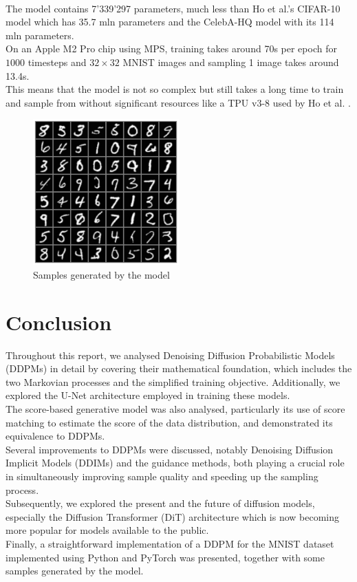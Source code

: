\documentclass[twoside]{article}
\numberwithin{equation}{section}
\numberwithin{figure}{section}
\begin{document}
\\
The model contains 7'339'297 parameters, much less than Ho et al.'s CIFAR-10 model which has 35.7 mln parameters and the CelebA-HQ model with its 114 mln parameters. \cite{ho2020denoising} \\
On an Apple M2 Pro chip using MPS, training takes around 70s per epoch for $1000$ timesteps and $32 \times 32$ MNIST images and sampling 1 image takes around 13.4s. \\
This means that the model is not so complex but still takes a long time to train and sample from without significant resources like a TPU v3-8 used by Ho et al. \cite{ho2020denoising}. 
\newpage
\begin{figure}[h]
  \begin{center}
    \includegraphics[width=0.5\textwidth]{images/sample.png}
    \caption{Samples generated by the model}
  \end{center}
\end{figure}
\newpage
\section{Conclusion}
Throughout this report, we analysed Denoising Diffusion Probabilistic Models (DDPMs) in detail by covering their mathematical foundation, which includes the two Markovian processes and the simplified training objective. Additionally, we explored the U-Net architecture employed in training these models. \\
The score-based generative model was also analysed, particularly its use of score matching to estimate the score of the data distribution, and demonstrated its equivalence to DDPMs. \\
Several improvements to DDPMs were discussed, notably Denoising Diffusion Implicit Models (DDIMs) and the guidance methods, both playing a crucial role in simultaneously improving sample quality and speeding up the sampling process. \\
Subsequently, we explored the present and the future of diffusion models, especially the Diffusion Transformer (DiT) architecture which is now becoming more popular for models available to the public. \\
Finally, a straightforward implementation of a DDPM for the MNIST dataset implemented using Python and PyTorch was presented, together with some samples generated by the model. \\
\end{document}
